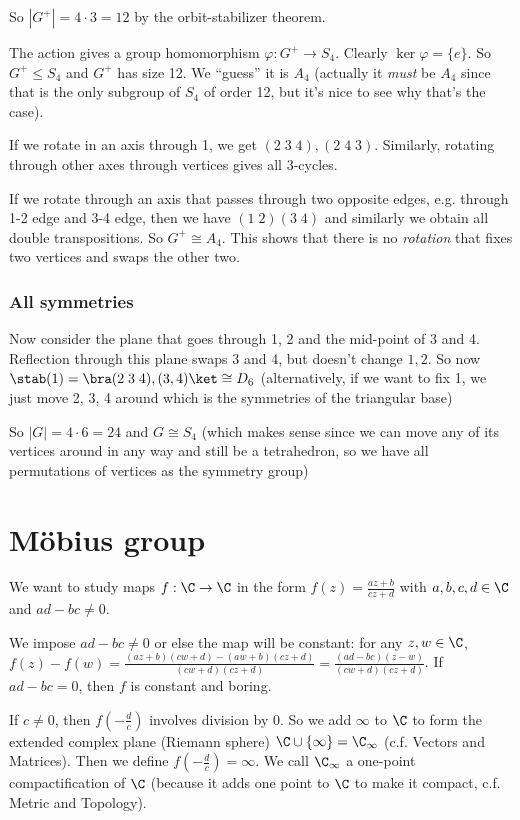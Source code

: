 \documentclass[a4paper]{article}
\begin{document}
  So $|G^+| = 4\cdot 3 = 12$ by the orbit-stabilizer theorem.

  The action gives a group homomorphism $\varphi: G^+ \to S_4$. Clearly $\ker \varphi = \{e\}$. So $G^+ \leq S_4$ and $G^+$ has size 12. We ``guess'' it is $A_4$ (actually it \emph{must} be $A_4$ since that is the only subgroup of $S_4$ of order 12, but it's nice to see why that's the case).

  If we rotate in an axis through 1, we get $(2\; 3\; 4), (2\; 4\; 3)$. Similarly, rotating through other axes through vertices gives all 3-cycles. 

  If we rotate through an axis that passes through two opposite edges, e.g. through 1-2 edge and 3-4 edge, then we have $(1\; 2)(3\; 4)$ and similarly we obtain all double transpositions. So $G^+ \cong A_4$. This shows that there is no \emph{rotation} that fixes two vertices and swaps the other two. 

  \subsubsection{All symmetries}
  Now consider the plane that goes through 1, 2 and the mid-point of 3 and 4. Reflection through this plane swaps 3 and 4, but doesn't change $1, 2$. So now $\stab(1) = \bra (2\; 3\; 4), (3, 4)\ket \cong D_6$ (alternatively, if we want to fix 1, we just move 2, 3, 4 around which is the symmetries of the triangular base)

  So $|G| = 4\cdot 6 = 24$ and $G\cong S_4$ (which makes sense since we can move any of its vertices around in any way and still be a tetrahedron, so we have all permutations of vertices as the symmetry group)

  \section{M\"obius group}
  We want to study maps $f: \C \to \C$ in the form $f(z) = \frac{az + b}{cz + d}$ with $a, b, c, d\in \C$ and $ad - bc \not= 0$.

  We impose $ad - bc\not= 0$ or else the map will be constant: for any $z, w\in \C$, $f(z) - f(w) = \frac{(az + b)(cw + d) - (aw + b)(cz + d)}{(cw + d)(cz + d)} = \frac{(ad - bc)(z - w)}{(cw + d)(cz + d)}$. If $ad - bc = 0$, then $f$ is constant and boring.

  If $c\not=0$, then $f(-\frac{d}{c})$ involves division by 0. So we add $\infty$ to $\C$ to form the extended complex plane (Riemann sphere) $\C\cup \{\infty\}= \C_\infty$ (c.f. Vectors and Matrices). Then we define $f(-\frac{d}{c}) = \infty$. We call $\C_\infty$ a one-point compactification of $\C$ (because it adds one point to $\C$ to make it compact, c.f. Metric and Topology).
\end{document}
